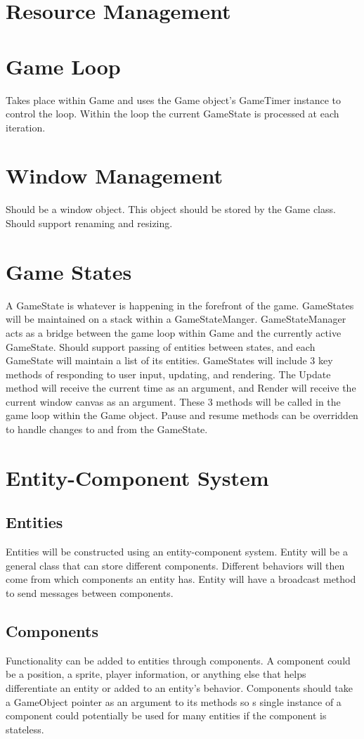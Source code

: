 \documentclass[12pt]{article}
\begin{document}
\section{Resource Management}

\section{Game Loop}
Takes place within Game and uses the Game object's GameTimer instance to control the loop.  Within the loop the current GameState is processed at each iteration.
		
\section{Window Management}
Should be a window object.  This object should be stored by the Game class.  Should support renaming and resizing.  
	
\section{	Game States}
A GameState is whatever is happening in the forefront of the game.  GameStates will be maintained on a stack within a GameStateManger.  GameStateManager acts as a bridge between the game loop within Game and the currently active GameState.  Should support passing of entities between states, and each GameState will maintain a list of its entities.  GameStates will include 3 key methods of responding to user input, updating, and rendering.  The Update method will receive the current time as an argument, and Render will receive the current window canvas as an argument.  These 3 methods will be called in the game loop within the Game object.  Pause and resume methods can be overridden to handle changes to and from the GameState.

\section{ Entity-Component System}
\subsection{	Entities }
Entities will be constructed using an entity-component system.  Entity will be a general class that can store different components.  Different behaviors will then come from which components an entity has.  Entity will have a broadcast method to send messages between components.
\subsection{	Components }
Functionality can be added to entities through components.  A component could be a position, a sprite, player information, or anything else that helps differentiate an entity or added to an entity's behavior.  Components should take a GameObject pointer as an argument to its methods so s single instance of a component could potentially be used for many entities if the component is stateless.
\end{document}
